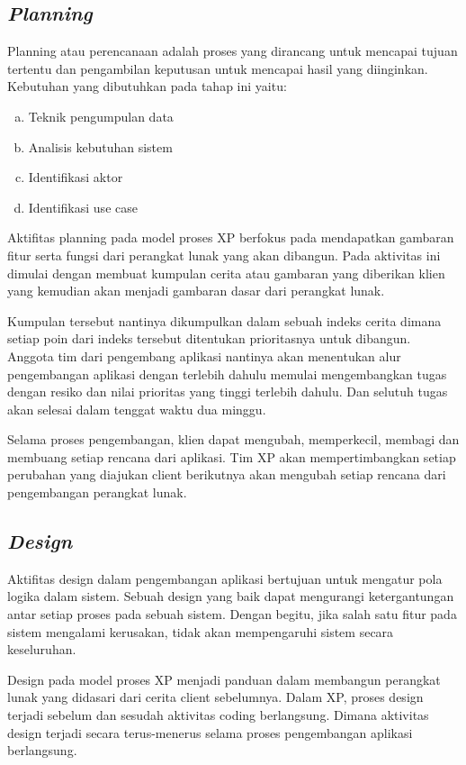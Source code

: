 \subsection{\textit{Planning}}
Planning atau perencanaan adalah proses yang dirancang untuk mencapai tujuan tertentu dan pengambilan keputusan untuk mencapai hasil yang diinginkan. Kebutuhan yang dibutuhkan pada tahap ini yaitu:
\begin {enumerate} [a.]
\itemsep0em
\item Teknik pengumpulan data
\item Analisis kebutuhan sistem
\item Identifikasi aktor
\item Identifikasi use case
\end {enumerate}
\par Aktifitas planning pada model proses XP berfokus pada mendapatkan gambaran fitur serta fungsi dari perangkat lunak yang akan dibangun. Pada aktivitas ini dimulai dengan membuat kumpulan cerita atau gambaran yang diberikan klien yang kemudian akan menjadi gambaran dasar dari perangkat lunak.
\par Kumpulan tersebut nantinya dikumpulkan dalam sebuah indeks cerita dimana setiap poin dari indeks tersebut ditentukan prioritasnya untuk dibangun. Anggota tim dari pengembang aplikasi nantinya akan menentukan alur pengembangan aplikasi dengan terlebih dahulu memulai mengembangkan tugas dengan resiko dan nilai prioritas yang tinggi terlebih dahulu. Dan selutuh tugas akan selesai dalam tenggat waktu dua minggu.
\par Selama proses pengembangan, klien dapat mengubah, memperkecil, membagi dan membuang setiap rencana dari aplikasi. Tim XP akan mempertimbangkan setiap perubahan yang diajukan client berikutnya akan mengubah setiap rencana dari pengembangan perangkat lunak.

\subsection{\emph{Design}}
\par Aktifitas design dalam pengembangan aplikasi bertujuan untuk mengatur pola logika dalam sistem. Sebuah design yang baik dapat mengurangi ketergantungan antar setiap proses pada sebuah sistem. Dengan begitu, jika salah satu fitur pada sistem mengalami kerusakan, tidak akan mempengaruhi sistem secara keseluruhan.
\par Design pada model proses XP menjadi panduan dalam membangun perangkat lunak yang didasari dari cerita client sebelumnya. Dalam XP, proses design terjadi sebelum dan sesudah aktivitas coding berlangsung. Dimana aktivitas design terjadi secara terus-menerus selama proses pengembangan aplikasi berlangsung.

